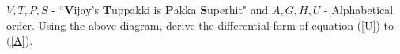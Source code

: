 \documentclass{article}
\begin{document}
\begin{center}
\end{center}
\noindent
$V,T,P,S$ - ``\textbf{V}ijay's \textbf{T}uppakki is \textbf{P}akka \textbf{S}uperhit" and $A,G,H,U$ - Alphabetical order. Using the above diagram, derive the differential form of equation (\ref{U}) to (\ref{A}).
\end{document}
